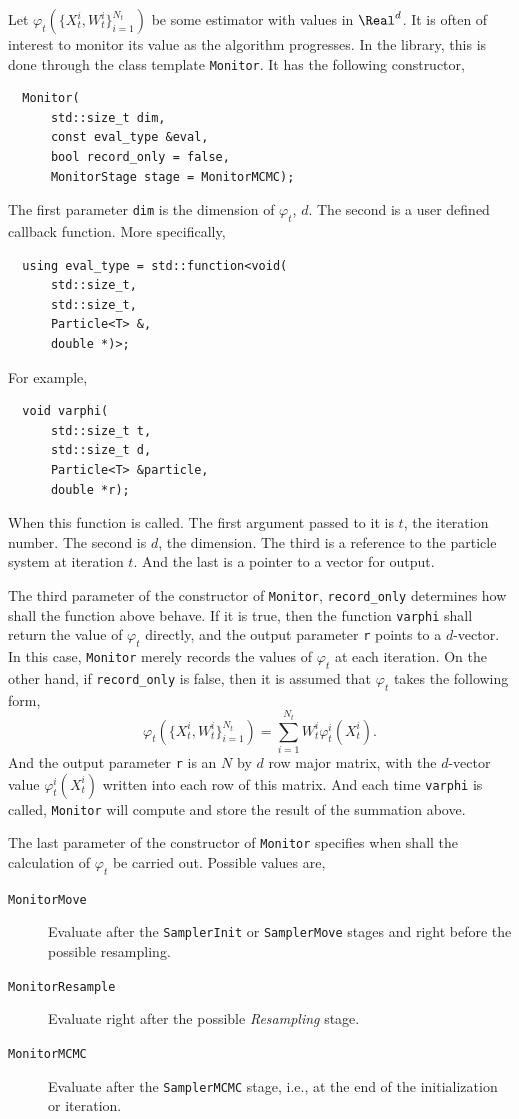 Let $\varphi_t(\{X_t^i,W_t^i\}_{i=1}^{N_t})$ be some estimator with values in
$\Real^d$. It is often of interest to monitor its value as the algorithm
progresses. In the library, this is done through the class template
\verb|Monitor|. It has the following constructor,
\begin{Verbatim}
  Monitor(
      std::size_t dim,
      const eval_type &eval,
      bool record_only = false,
      MonitorStage stage = MonitorMCMC);
\end{Verbatim}
The first parameter \verb|dim| is the dimension of $\varphi_t$, $d$. The second
is a user defined callback function. More specifically,
\begin{Verbatim}
  using eval_type = std::function<void(
      std::size_t,
      std::size_t,
      Particle<T> &,
      double *)>;
\end{Verbatim}
For example,
\begin{Verbatim}
  void varphi(
      std::size_t t,
      std::size_t d,
      Particle<T> &particle,
      double *r);
\end{Verbatim}
When this function is called. The first argument passed to it is $t$, the
iteration number. The second is $d$, the dimension. The third is a reference to
the particle system at iteration $t$. And the last is a pointer to a vector for
output.

The third parameter of the constructor of \verb|Monitor|, \verb|record_only|
determines how shall the function above behave. If it is true, then the
function \verb|varphi| shall return the value of $\varphi_t$ directly, and the
output parameter \verb|r| points to a $d$-vector. In this case, \verb|Monitor|
merely records the values of $\varphi_t$ at each iteration. On the other hand,
if \verb|record_only| is false, then it is assumed that $\varphi_t$ takes the
following form,
\begin{equation*}
  \varphi_t(\{X_t^i,W_t^i\}_{i=1}^{N_t}) =
  \sum_{i=1}^{N_t} W_t^i \varphi_t^i(X_t^i).
\end{equation*}
And the output parameter \verb|r| is an $N$ by $d$ row major matrix, with the
$d$-vector value $\varphi_t^i(X_t^i)$ written into each row of this matrix. And
each time \verb|varphi| is called, \verb|Monitor| will compute and store the
result of the summation above.

The last parameter of the constructor of \verb|Monitor| specifies when shall
the calculation of $\varphi_t$ be carried out. Possible values are,
\begin{description}
  \item[\texttt{MonitorMove}] Evaluate after the \verb|SamplerInit| or
    \verb|SamplerMove| stages and right before the possible resampling.
  \item[\texttt{MonitorResample}] Evaluate right after the possible
    \emph{Resampling} stage.
  \item[\texttt{MonitorMCMC}] Evaluate after the \verb|SamplerMCMC| stage,
    i.e., at the end of the initialization or iteration.
\end{description}

